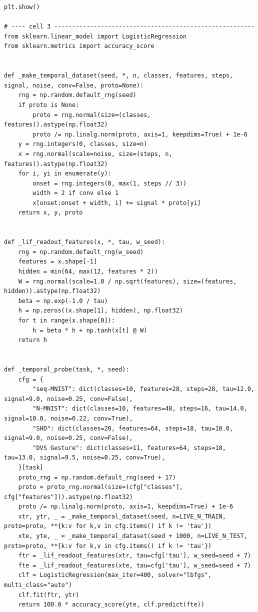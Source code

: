 \begin{lstlisting}[caption={experiments/temporal\_storerecall.ipynb},label={lst:mnn-nb-temporal-storerecall}]
plt.show()

# ---- cell 3 --------------------------------------------------------
from sklearn.linear_model import LogisticRegression
from sklearn.metrics import accuracy_score


def _make_temporal_dataset(seed, *, n, classes, features, steps, signal, noise, conv=False, proto=None):
    rng = np.random.default_rng(seed)
    if proto is None:
        proto = rng.normal(size=(classes, features)).astype(np.float32)
        proto /= np.linalg.norm(proto, axis=1, keepdims=True) + 1e-6
    y = rng.integers(0, classes, size=n)
    x = rng.normal(scale=noise, size=(steps, n, features)).astype(np.float32)
    for i, yi in enumerate(y):
        onset = rng.integers(0, max(1, steps // 3))
        width = 2 if conv else 1
        x[onset:onset + width, i] += signal * proto[yi]
    return x, y, proto


def _lif_readout_features(x, *, tau, w_seed):
    rng = np.random.default_rng(w_seed)
    features = x.shape[-1]
    hidden = min(64, max(12, features * 2))
    W = rng.normal(scale=1.0 / np.sqrt(features), size=(features, hidden)).astype(np.float32)
    beta = np.exp(-1.0 / tau)
    h = np.zeros((x.shape[1], hidden), np.float32)
    for t in range(x.shape[0]):
        h = beta * h + np.tanh(x[t] @ W)
    return h


def _temporal_probe(task, *, seed):
    cfg = {
        "seq-MNIST": dict(classes=10, features=28, steps=28, tau=12.0, signal=9.0, noise=0.25, conv=False),
        "N-MNIST": dict(classes=10, features=48, steps=16, tau=14.0, signal=10.0, noise=0.22, conv=True),
        "SHD": dict(classes=20, features=64, steps=18, tau=10.0, signal=9.0, noise=0.25, conv=False),
        "DVS Gesture": dict(classes=11, features=64, steps=18, tau=13.0, signal=9.5, noise=0.25, conv=True),
    }[task]
    proto_rng = np.random.default_rng(seed + 17)
    proto = proto_rng.normal(size=(cfg["classes"], cfg["features"])).astype(np.float32)
    proto /= np.linalg.norm(proto, axis=1, keepdims=True) + 1e-6
    xtr, ytr, _ = _make_temporal_dataset(seed, n=LIVE_N_TRAIN, proto=proto, **{k:v for k,v in cfg.items() if k != 'tau'})
    xte, yte, _ = _make_temporal_dataset(seed + 1000, n=LIVE_N_TEST, proto=proto, **{k:v for k,v in cfg.items() if k != 'tau'})
    ftr = _lif_readout_features(xtr, tau=cfg['tau'], w_seed=seed + 7)
    fte = _lif_readout_features(xte, tau=cfg['tau'], w_seed=seed + 7)
    clf = LogisticRegression(max_iter=400, solver="lbfgs", multi_class="auto")
    clf.fit(ftr, ytr)
    return 100.0 * accuracy_score(yte, clf.predict(fte))


\end{lstlisting}
